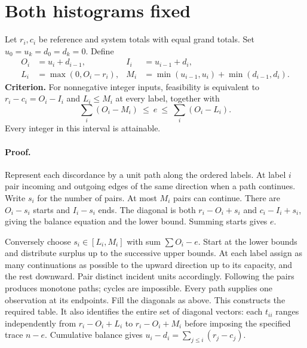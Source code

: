 \documentclass[11pt]{article}
\begin{document}
\section{Both histograms fixed}
Let $r_i,c_i$ be reference and system totals with equal grand totals. Set $u_0=u_k=d_0=d_k=0$. Define
\begin{align*}
 O_i&=u_i+d_{i-1}, & I_i&=u_{i-1}+d_i,\\
 L_i&=\max(0,O_i-r_i), & M_i&=\min(u_{i-1},u_i)+\min(d_{i-1},d_i).
\end{align*}
\textbf{Criterion.} For nonnegative integer inputs, feasibility is equivalent to $r_i-c_i=O_i-I_i$ and $L_i\le M_i$ at every label, together with
\[
 \sum_i(O_i-M_i)\ \le\ e\ \le\ \sum_i(O_i-L_i).
\]
Every integer in this interval is attainable.

\paragraph{Proof.} Represent each discordance by a unit path along the ordered labels. At label $i$ pair incoming and outgoing edges of the same direction when a path continues. Write $s_i$ for the number of pairs. At most $M_i$ pairs can continue. There are $O_i-s_i$ starts and $I_i-s_i$ ends. The diagonal is both $r_i-O_i+s_i$ and $c_i-I_i+s_i$, giving the balance equation and the lower bound. Summing starts gives $e$.

Conversely choose $s_i\in[L_i,M_i]$ with sum $\sum O_i-e$. Start at the lower bounds and distribute surplus up to the successive upper bounds. At each label assign as many continuations as possible to the upward direction up to its capacity, and the rest downward. Pair distinct incident units accordingly. Following the pairs produces monotone paths; cycles are impossible. Every path supplies one observation at its endpoints. Fill the diagonals as above. This constructs the required table. It also identifies the entire set of diagonal vectors: each $t_{ii}$ ranges independently from $r_i-O_i+L_i$ to $r_i-O_i+M_i$ before imposing the specified trace $n-e$. Cumulative balance gives $u_i-d_i=\sum_{j\le i}(r_j-c_j)$.
\end{document}
